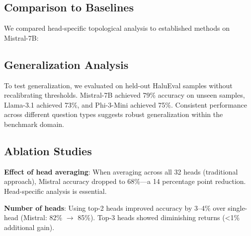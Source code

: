 \documentclass[11pt,twocolumn]{article}
\begin{document}
\subsection{Comparison to Baselines}

We compared head-specific topological analysis to established methods on Mistral-7B:

\begin{table}[h]
\centering
{}
\caption{Method comparison. Our approach achieves highest accuracy among training-free methods.}
\label{tab:comparison}
\end{table}

\subsection{Generalization Analysis}

To test generalization, we evaluated on held-out HaluEval samples without recalibrating thresholds. Mistral-7B achieved 79\% accuracy on unseen samples, Llama-3.1 achieved 73\%, and Phi-3-Mini achieved 75\%. Consistent performance across different question types suggests robust generalization within the benchmark domain.

\subsection{Ablation Studies}

\textbf{Effect of head averaging}: When averaging across all 32 heads (traditional approach), Mistral accuracy dropped to 68\%---a 14 percentage point reduction. Head-specific analysis is essential.

\textbf{Number of heads}: Using top-2 heads improved accuracy by 3--4\% over single-head (Mistral: 82\% $\rightarrow$ 85\%). Top-3 heads showed diminishing returns (<1\% additional gain).
\end{document}
